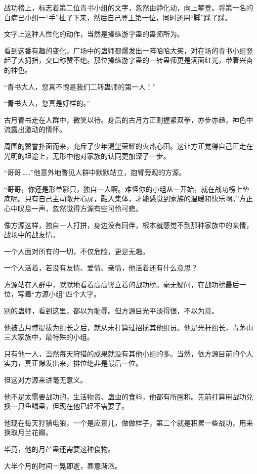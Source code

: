 \begin{this_body}
战功榜上，标志着第二位青书小组的文字，忽然由静化动，向上攀登。将第一名的白病已小组一“手”扯了下来，然后自己登上第一位，同时还用“脚”踩了踩。

文字上这种人性化的动作，当然是操纵游字蛊的蛊师所为。

看到这番有趣的变化，广场中的蛊师都爆发出一阵哈哈大笑，对在场的青书小组竖起了大拇指，交口称赞不绝。那位操纵游字蛊的一转蛊师更是满面红光，带着兴奋的神色。

“青书大人，您真不愧是我们二转蛊师的第一人！”

“青书大人，您真是好样的。”

古月青书走在人群中，微笑以待。身后的古月方正则握紧双拳，亦步亦趋，神色中流露出激动的情怀。

周围的赞誉扑面而来，充斥了少年渴望荣耀的火热心田。这让方正觉得自己正走在光明的坦途上，无形中他对家族的认同更加深了一步。

“哥哥……”他意外地瞥见人群中默默站立，抱臂旁观的方源。

“哥哥，你还是形单影只，独自一人啊。难怪你的小组从一开始，就在战功榜上垫底呢。只有自己主动敞开心扉，融入集体，才能感觉到家族的温暖和快乐啊。”方正心中叹息一声，忽然觉得方源有些可怜可悲。

像方源这样，独自一人打拼，身边没有同伴，根本就感觉不到那种家族中的亲情，战场中的战友情。

一个人面对所有的一切，不仅危险，更是无趣。

一个人活着，若没有友情、爱情、亲情，他活着还有什么意思？

方源站在人群中，默默地看着高高竖立着的战功榜。毫无疑问，在战功榜最后一位，写着“方源小组”四个大字。

别的蛊师，看到这里，都以为耻辱。但方源目光平淡得很，不以为意。

他被古月博提拔为组长之后，就从未打算过招揽其他组员。他是光杆组长，青茅山三大家族中，最特殊的小组。

只有他一人，当然每天狩猎的成果就没有其他小组的多。当然，依方源目前的个人实力，真正爆发出来，排位绝非是最后一位。

但这对方源来讲毫无意义。

他不是太需要战功的，生活物资、蛊虫的食料，他都有所囤积。先前打算用战功兑换一只鱼鳞蛊，但现在他已经不需要了。

他现在每天狩猎电狼，一个是应景儿，做做样子，第二个就是积累一些战功，用来换取月兰花瓣。

毕竟，他的月芒蛊还需要这种食物。

大半个月的时间一晃即逝，春意渐浓。


\end{this_body}
